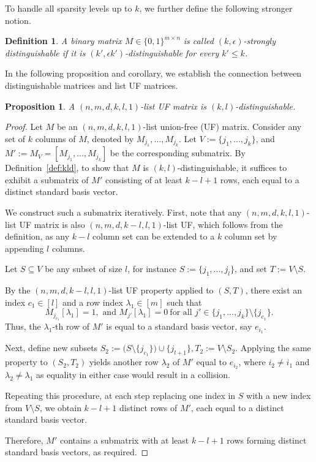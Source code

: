 \documentclass{article}
\newtheorem{definition}{Definition}[subsection]
\newtheorem{proposition}{Proposition}[subsection]
\begin{document}
To handle all sparsity levels up to $k$, we further define the following stronger notion.

\begin{definition}\label{def:strongbasic}
A binary matrix $M \in \{0,1\}^{m \times n}$ is called $(k,\epsilon)$-\emph{strongly distinguishable} if it is $(k', \epsilon k')$-distinguishable for every $k' \leq k$.
\end{definition}

In the following proposition and corollary, we establish the connection between distinguishable matrices and list UF matrices.

\begin{proposition}\label{prop2.1.1}
    A $(n,m,d,k,l, 1)$-list UF matrix is $(k,l)$-distinguishable.
\end{proposition}
\begin{proof}
    Let $M$ be an $(n,m,d,k,l,1)$-list union-free (UF) matrix. Consider any set of $k$ columns of $M$, denoted by $M_{j_1}, \dots, M_{j_k}$. Let $V:=\{j_1,...,j_k\}$, and
\(
M' := M_{V} = [M_{j_1}, \dots, M_{j_k}]
\)
be the corresponding submatrix. 
By Definition~\ref{def:kld}, to show that $M$ is $(k,l)$-distinguishable, it suffices to exhibit a submatrix of $M'$ consisting of at least $k - l + 1$ rows, each equal to a distinct standard basis vector.

We construct such a submatrix iteratively. First, note that any $(n,m,d,k,l,1)$-list UF matrix is also $(n,m,d,k-l,l,1)$-list UF, which  follows from the definition, as any $k-l$ column set can be extended to a $k$ column set by appending $l$ columns.

Let $S \subseteq V$ be any subset of size $l$, for instance
\(
S := \{j_1,...,j_l\}\), and set \( T := V \setminus S.
\)

By the $(n,m,d,k-l,l,1)$-list UF property applied to $(S,T)$, there exist an index $c_1 \in [l]$ and a row index $\lambda_1 \in [m]$ such that
\[
M_{j_{c_1}}[\lambda_1] = 1, \text{ and } M_{j'}[\lambda_1] = 0 \ \text{for all } j'\in \{j_1,...,j_k\} \setminus \{j_{c_1}\}.
\]
Thus, the $\lambda_1$-th row of $M'$ is equal to a standard basis vector, say $e_{i_1}$.

Next, define new subsets
\(
S_2 := \bigl(S \setminus \{j_{c_1}\}\bigr) \cup \{j_{l+1}\},  T_2 := V \setminus S_2.
\)
Applying the same property to $(S_2, T_2)$ yields another row $\lambda_2$ of $M'$ equal to $e_{i_2}$, where $i_2 \neq i_1$ and $\lambda_2\neq \lambda_1$ as equality in either case would result in a collision.

Repeating this procedure, at each step replacing one index in $S$ with a new index from $V \setminus S$, we obtain $k - l + 1$ distinct rows of $M'$, each equal to a distinct standard basis vector.

Therefore, $M'$ contains a submatrix with at least $k - l + 1$ rows forming distinct standard basis vectors, as required.
\end{proof}
\end{document}
